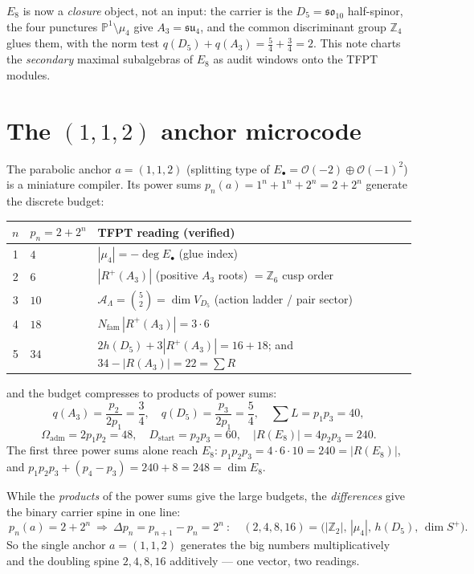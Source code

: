 \documentclass[11pt,a4paper]{article}
\newcommand{\Nfam}{N_{\mathrm{fam}}}
\newcommand{\Oadm}{\Omega_{\mathrm{adm}}}
\newcommand{\AL}{\mathcal A_\Lambda}
\newcommand{\PP}{\mathbb{P}}
\newcommand{\Z}{\mathbb{Z}}
\theoremstyle{definition}
\renewcommand{\arraystretch}{1.15}
\begin{document}
\noindent $E_8$ is now a \emph{closure} object, not an input: the carrier is the $D_5=\mathfrak{so}_{10}$
half-spinor, the four punctures $\PP^1\setminus\mu_4$ give $A_3=\mathfrak{su}_4$, and the common
discriminant group $\Z_4$ glues them, with the norm test $q(D_5)+q(A_3)=\tfrac54+\tfrac34=2$. This note
charts the \emph{secondary} maximal subalgebras of $E_8$ as audit windows onto the TFPT modules.

\section{The $(1,1,2)$ anchor microcode}
The parabolic anchor $a=(1,1,2)$ (splitting type of $E_\bullet=\mathcal O(-2)\oplus\mathcal O(-1)^2$) is a
miniature compiler. Its power sums $p_n(a)=1^n+1^n+2^n=2+2^n$ generate the discrete budget:

\begin{center}\small
\renewcommand{\arraystretch}{1.2}
\begin{tabularx}{\linewidth}{@{}clY@{}}
\toprule
$n$ & $p_n=2+2^n$ & \textbf{TFPT reading (verified)} \\
 & $4$ & $|\mu_4|=-\deg E_\bullet$ (glue index) \\
2 & $6$ & $|R^+(A_3)|$ (positive $A_3$ roots) $=\Z_6$ cusp order \\
3 & $10$ & $\AL=\binom52=\dim V_{D_5}$ (action ladder / pair sector) \\
4 & $18$ & $\Nfam\,|R^+(A_3)|=3\cdot6$ \\
5 & $34$ & $2h(D_5)+3|R^+(A_3)|=16+18$; and $34-|R(A_3)|=22=\sum R$ \\
\bottomrule
\end{tabularx}
\end{center}

\noindent and the budget compresses to products of power sums:
\[
  q(A_3)=\frac{p_2}{2p_1}=\frac34,\quad q(D_5)=\frac{p_3}{2p_1}=\frac54,\quad
  \textstyle\sum L=p_1p_3=40,
\]
\[
  \Oadm=2p_1p_2=48,\quad D_{\mathrm{start}}=p_2p_3=60,\quad |R(E_8)|=4p_2p_3=240.
\]
The first three power sums alone reach $E_8$: $p_1p_2p_3=4\cdot6\cdot10=240=|R(E_8)|$, and
$p_1p_2p_3+(p_4-p_3)=240+8=248=\dim E_8$.

\begin{winbox}
While the \emph{products} of the power sums give the large budgets, the \emph{differences} give the
binary carrier spine in one line:
\[
  \boxed{\ p_n(a)=2+2^n\ \Longrightarrow\ \Delta p_n=p_{n+1}-p_n=2^n\ }:\quad
  (2,4,8,16)=\bigl(|\Z_2|,\,|\mu_4|,\,h(D_5),\,\dim S^+\bigr).
\]
So the single anchor $a=(1,1,2)$ generates the big numbers multiplicatively and the doubling spine
$2,4,8,16$ additively --- one vector, two readings.
\end{winbox}
\end{document}
